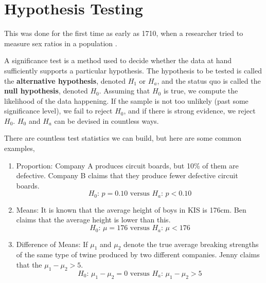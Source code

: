 \documentclass{article}
\begin{document}
\section{Hypothesis Testing}

    This was done for the first time as early as 1710, when a researcher tried to measure sex ratios in a population \cite{1710arbuthnot}. 
    
    A significance test is a method used to decide whether the data at hand sufficiently supports a particular hypothesis. The hypothesis to be tested is called the \textbf{alternative hypothesis}, denoted $H_1$ or $H_a$, and the status quo is called the \textbf{null hypothesis}, denoted $H_0$. Assuming that $H_0$ is true, we compute the likelihood of the data happening. If the sample is not too unlikely (past some significance level), we fail to reject $H_0$, and if there is strong evidence, we reject $H_0$. $H_0$ and $H_a$ can be devised in countless ways. 

    \begin{example}
      There are countless test statistics we can build, but here are some common examples, 
      \begin{enumerate}
        \item Proportion: Company A produces circuit boards, but 10\% of them are defective. Company B claims that they produce fewer defective circuit boards. 
        \begin{equation}
          H_0 : \, p = 0.10 \text{ versus } H_a : \, p < 0.10
        \end{equation}
        
        \item Means: It is known that the average height of boys in KIS is 176cm. Ben claims that the average height is lower than this. 
        \begin{equation}
          H_0 : \, \mu = 176 \text{ versus } H_a : \, \mu < 176
        \end{equation}
        
        \item Difference of Means: If $\mu_1$ and $\mu_2$ denote the true average breaking strengths of the same type of twine produced by two different companies. Jenny claims that the $\mu_1 - \mu_2 > 5$. 
        \begin{equation}
          H_0 : \, \mu_1 - \mu_2 = 0 \text{ versus } H_a : \, \mu_1 - \mu_2 > 5
        \end{equation}
      \end{enumerate}
    \end{example}
\end{document}
